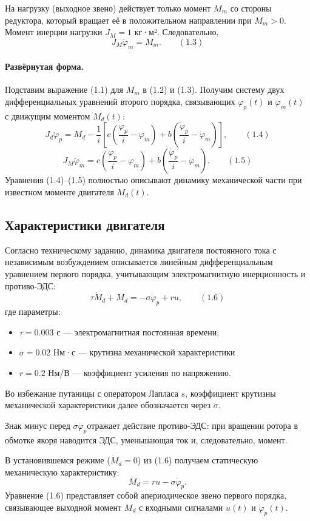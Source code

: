 \documentclass[a4paper, 14pt]{extarticle}
\begin{document}
На нагрузку (выходное звено) действует только момент \(M_m\) со стороны редуктора, который вращает её в положительном направлении при \(M_m>0\). Момент инерции нагрузки \(J_M = 1\) кг·м². Следовательно,
\[
    J_M \ddot{\varphi}_m = M_m. \qquad (1.3)
\]

\paragraph{Развёрнутая форма.}
Подставим выражение (1.1) для \(M_m\) в (1.2) и (1.3). Получим систему двух дифференциальных уравнений второго порядка, связывающих \(\varphi_p(t)\) и \(\varphi_m(t)\) с движущим моментом \(M_d(t)\):
\[
    J_d \ddot{\varphi}_p = M_d - \frac{1}{i}\left[c\left(\frac{\varphi_p}{i} - \varphi_m\right) + b\left(\frac{\dot{\varphi}_p}{i} - \dot{\varphi}_m\right)\right], \qquad (1.4)
\]
\[
    J_M \ddot{\varphi}_m = c\left(\frac{\varphi_p}{i} - \varphi_m\right) + b\left(\frac{\dot{\varphi}_p}{i} - \dot{\varphi}_m\right). \qquad (1.5)
\]
Уравнения (1.4)–(1.5) полностью описывают динамику механической части при известном моменте двигателя \(M_d(t)\).

\subsection{Характеристики двигателя}
Согласно техническому заданию, динамика двигателя постоянного тока с независимым возбуждением описывается линейным дифференциальным уравнением первого порядка, учитывающим электромагнитную инерционность и противо-ЭДС:
\[
    \tau \dot{M}_d + M_d = -\sigma\dot{\varphi}_p + r u, \qquad (1.6)
\]
где параметры:
\begin{itemize}
    \item \(\tau = 0.003\) с — электромагнитная постоянная времени;
    \item \(\sigma = 0.02\) Нм·с — крутизна механической характеристики
    \item \(r = 0.2\) Нм/В — коэффициент усиления по напряжению.
\end{itemize}
Во избежание путаницы с оператором Лапласа \(s\),
коэффициент крутизны механической характеристики
далее обозначается через \(\sigma\).

Знак минус перед \(\sigma\dot{\varphi}_p\)отражает действие противо-ЭДС: при вращении ротора в обмотке якоря наводится ЭДС, уменьшающая ток и, следовательно, момент.

В установившемся режиме (\(\dot{M}_d = 0\)) из (1.6) получаем статическую механическую характеристику:
\[
    M_d = r u - \sigma \dot{\varphi}_p.
\]
Уравнение (1.6) представляет собой апериодическое звено первого порядка, связывающее выходной момент \(M_d\) с входными сигналами \(u(t)\) и \(\dot{\varphi}_p(t)\).
\end{document}
